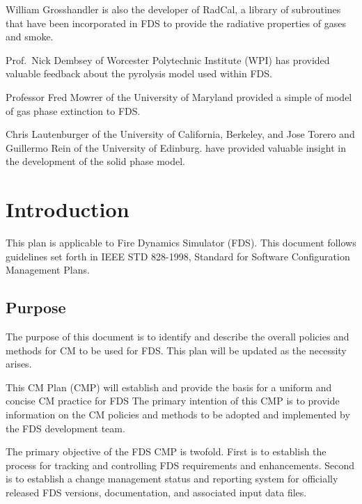 \documentclass[11pt]{book}
\begin{document}
William Grosshandler is also the developer of RadCal, a library of
subroutines that have been incorporated in FDS to provide the
radiative properties of gases and smoke.

Prof.~Nick Dembsey of Worcester Polytechnic Institute (WPI) has provided valuable feedback about the pyrolysis model used within FDS.

Professor Fred Mowrer of the University of Maryland provided a simple
of model of gas phase extinction to FDS.

Chris Lautenburger of the University of California, Berkeley, and Jose Torero and Guillermo Rein of the University of Edinburg. have
provided valuable insight in the development of the solid phase model.












\tableofcontents

\mainmatter

\chapter{Introduction}

This plan is applicable to Fire Dynamics Simulator (FDS).  This document follows guidelines set forth in IEEE 
STD 828-1998, Standard for Software Configuration Management Plans.

\section{Purpose}

The purpose of this document is to identify and describe the overall policies and methods for CM to be used for
FDS.  This plan will be updated as the necessity arises. 

This CM Plan (CMP) will establish and provide the basis for a uniform and concise CM practice for FDS
The primary intention of this CMP is to provide information on the CM policies and methods to be adopted and
implemented by the FDS development team.

The primary objective of the FDS CMP is twofold.  First is to establish the process for tracking and controlling
FDS requirements and enhancements.  Second is to establish a change management status and reporting system for
officially released FDS versions, documentation, and associated input data files.
\end{document}

